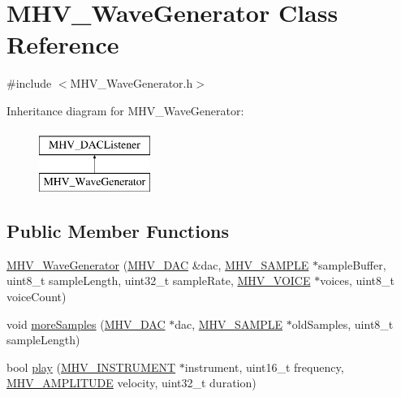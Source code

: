 \hypertarget{class_m_h_v___wave_generator}{\section{M\-H\-V\-\_\-\-Wave\-Generator Class Reference}
\label{class_m_h_v___wave_generator}
}


{\ttfamily \#include $<$M\-H\-V\-\_\-\-Wave\-Generator.\-h$>$}

Inheritance diagram for M\-H\-V\-\_\-\-Wave\-Generator\-:\begin{figure}[H]
\begin{center}
\leavevmode
\includegraphics[height=2.000000cm]{class_m_h_v___wave_generator}
\end{center}
\end{figure}
\subsection*{Public Member Functions}
\begin{DoxyCompactItemize}
\item 
\hyperlink{class_m_h_v___wave_generator_a00832ec1568e58f54dc4e4cb1b7399b6}{M\-H\-V\-\_\-\-Wave\-Generator} (\hyperlink{class_m_h_v___d_a_c}{M\-H\-V\-\_\-\-D\-A\-C} \&dac, \hyperlink{_m_h_v___d_a_c_8h_a5ed12db0bcd6a3870733daecfb30e640}{M\-H\-V\-\_\-\-S\-A\-M\-P\-L\-E} $\ast$sample\-Buffer, uint8\-\_\-t sample\-Length, uint32\-\_\-t sample\-Rate, \hyperlink{_m_h_v___wave_generator_8h_a6e1f0fc3a346e43815c488947b5887f0}{M\-H\-V\-\_\-\-V\-O\-I\-C\-E} $\ast$voices, uint8\-\_\-t voice\-Count)
\item 
void \hyperlink{class_m_h_v___wave_generator_a57d400e9427c7cfb38c6700c202998e5}{more\-Samples} (\hyperlink{class_m_h_v___d_a_c}{M\-H\-V\-\_\-\-D\-A\-C} $\ast$dac, \hyperlink{_m_h_v___d_a_c_8h_a5ed12db0bcd6a3870733daecfb30e640}{M\-H\-V\-\_\-\-S\-A\-M\-P\-L\-E} $\ast$old\-Samples, uint8\-\_\-t sample\-Length)
\item 
bool \hyperlink{class_m_h_v___wave_generator_ae9e9adfb5c34e678a3cf24d8971997b0}{play} (\hyperlink{_m_h_v___wave_generator_8h_ad8420c0a6c4bf917359c2c4f2e7720d3}{M\-H\-V\-\_\-\-I\-N\-S\-T\-R\-U\-M\-E\-N\-T} $\ast$instrument, uint16\-\_\-t frequency, \hyperlink{_m_h_v___wave_generator_8h_ae0ff00bbcfd596fc3d6afab09bb5e11c}{M\-H\-V\-\_\-\-A\-M\-P\-L\-I\-T\-U\-D\-E} velocity, uint32\-\_\-t duration)
\end{DoxyCompactItemize}


